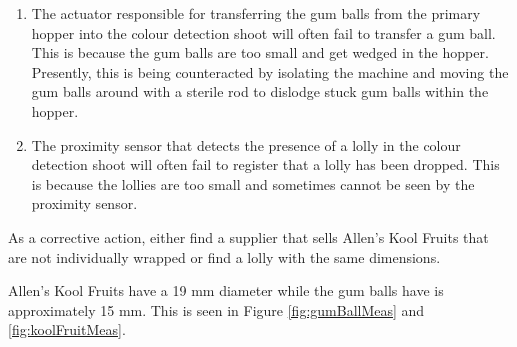 			\begin{enumerate}
				\item The actuator responsible for transferring the gum balls from the primary hopper into the colour detection shoot will often fail to transfer a gum ball. This is because the gum balls are too small and get wedged in the hopper. Presently, this is being counteracted by isolating the machine and moving the gum balls around with a sterile rod to dislodge stuck gum balls within the hopper.
				\item The proximity sensor that detects the presence of a lolly in the colour detection shoot will often fail to register that a lolly has been dropped. This is because the lollies are too small and sometimes cannot be seen by the proximity sensor. 
			\end{enumerate}
			
			As a corrective action, either find a supplier that sells Allen's Kool Fruits that are not individually wrapped or find a lolly with the same dimensions.
			
			Allen's Kool Fruits have a 19 mm diameter while the gum balls have is approximately 15 mm. This is seen in Figure \ref{fig:gumBallMeas} and \ref{fig:koolFruitMeas}.

